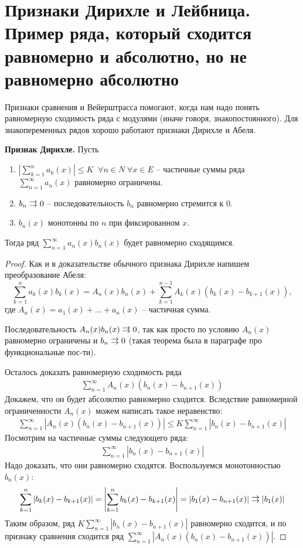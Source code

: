 \section{Признаки Дирихле и Лейбница. Пример ряда, который сходится равномерно и абсолютно, но не равномерно абсолютно}
Признаки сравнения и Вейерштрасса помогают, когда нам надо понять равномерную сходимость ряда с модулями (иначе говоря, знакопостоянного).
Для знакопеременных рядов хорошо работают признаки Дирихле и Абеля.

\textbf{Признак Дирихле.} 
Пусть \begin{enumerate}
    \item $\left| \sum\limits_{k = 1}^n a_k(x) \right| \leqslant K \;\; \forall n \in N \; \forall x \in E$ -- частичные суммы ряда $\sum\limits_{n = 1}^\infty a_n(x)$ равномерно ограничены.
    \item $b_n \doublerightarrow 0$ -- последовательность $b_n$ равномерно стремится к 0.
    \item $b_n(x)$ монотонны по $n$ при фиксированном $x$.
\end{enumerate}
Тогда ряд $\sum\limits_{n = 1}^\infty a_n(x)b_n(x)$ будет равномерно сходящимся.

\begin{proof}
    Как и в доказательстве обычного признака Дирихле напишем преобразование Абеля: \[ \sum_{k=1}^n a_k(x)b_k(x) = A_n(x)b_n(x) + \sum_{k=1}^{n-1} A_k(x)(b_k(x) - b_{k+1}(x)), \]
    где $A_n(x) = a_1(x) + \dots + a_n(x)$ -- частичная сумма.

    \quad Последовательность $A_n(x)b_n(x) \doublerightarrow 0$, так как просто по условию $A_n(x)$ равномерно ограничены и $b_n \doublerightarrow 0$ (такая теорема была в параграфе про функциональные пос-ти).

    \quad Осталось доказать равномерную сходимость ряда 
    \begin{gather*}
        \sum\limits_{n = 1}^\infty A_n(x)(b_n(x) - b_{n+1}(x))
    \end{gather*}
    Докажем, что он будет абсолютно равномерно сходится.
    Вследствие равномерной ограниченности $A_n(x)$ можем написать такое неравенство: 
    \begin{gather*}
        \sum\limits_{n = 1}^\infty \left|A_n(x)(b_n(x) - b_{n+1}(x))\right| \leqslant K\sum\limits_{n = 1}^\infty \left|b_n(x) - b_{n+1}(x)\right|
    \end{gather*}
    Посмотрим на частичные суммы следующего ряда:
    \begin{gather*}
        \sum\limits_{n = 1}^\infty \left|b_n(x) - b_{n+1}(x)\right|
    \end{gather*}
    Надо доказать, что они равномерно сходятся.
    Воспользуемся монотонностью $b_n(x)$: \[ \sum\limits_{k = 1}^n \left|b_k(x) - b_{k+1}(x)\right| = \left|\sum\limits_{k = 1}^n b_k(x) - b_{k+1}(x)\right| = |b_1(x) - b_{n+1}(x)| \doublerightarrow |b_1(x)| \]
    \quad Таким образом, ряд $K\sum\limits_{n = 1}^\infty \left|b_n(x) - b_{n+1}(x)\right|$ равномерно сходится, и по признаку сравнения сходится ряд $\sum\limits_{n = 1}^\infty \left|A_n(x)(b_n(x) - b_{n+1}(x))\right|$.
\end{proof}


